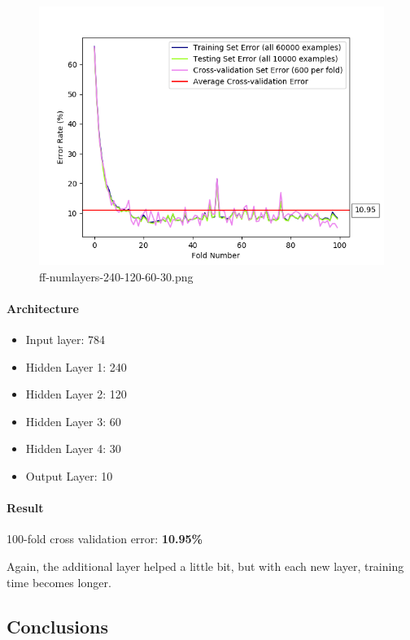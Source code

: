 \documentclass[11pt]{article}
\makeatletter
\def\maxwidth{\ifdim\Gin@nat@width>\linewidth\linewidth
    \else\Gin@nat@width\fi}
\let\Oldincludegraphics\includegraphics
\renewcommand{\includegraphics}[1]{\Oldincludegraphics[width=.8\maxwidth]{#1}}
\providecommand{\tightlist}{%
      \setlength{\itemsep}{0pt}\setlength{\parskip}{0pt}}
\makeatother
\begin{document}
\begin{figure}[htbp]
\centering
\includegraphics{plots/ff-numlayers-240-120-60-30.png}
\caption{ff-numlayers-240-120-60-30.png}
\end{figure}

\paragraph{Architecture}\label{architecture-4}

\begin{itemize}
\tightlist
\item
  Input layer: 784
\item
  Hidden Layer 1: 240
\item
  Hidden Layer 2: 120
\item
  Hidden Layer 3: 60
\item
  Hidden Layer 4: 30
\item
  Output Layer: 10
\end{itemize}

\paragraph{Result}\label{result-3}

100-fold cross validation error: \textbf{10.95\%}

Again, the additional layer helped a little bit, but with each new
layer, training time becomes longer.

\pagebreak

\subsection{Conclusions}\label{conclusions}
\end{document}

